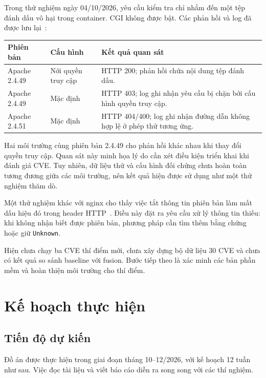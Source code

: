 \documentclass[11pt,a4paper]{article}
\begin{document}
Trong thử nghiệm ngày 04/10/2026, yêu cầu kiểm tra chỉ nhắm đến một tệp đánh dấu vô hại trong container. CGI không được bật. Các phản hồi và log đã được lưu lại~\cite{labrecord}:

\begin{center}
\small
\begin{tabularx}{\linewidth}{@{}P{2.5cm}P{3.5cm}Y@{}}
\toprule
\textbf{Phiên bản} & \textbf{Cấu hình} & \textbf{Kết quả quan sát} \\
\midrule
Apache 2.4.49 & Nới quyền truy cập & HTTP 200; phản hồi chứa nội dung tệp đánh dấu. \\
Apache 2.4.49 & Mặc định & HTTP 403; log ghi nhận yêu cầu bị chặn bởi cấu hình quyền truy cập. \\
Apache 2.4.51 & Mặc định & HTTP 404/400; log ghi nhận đường dẫn không hợp lệ ở phép thử tương ứng. \\
\bottomrule
\end{tabularx}
\end{center}

Hai môi trường cùng phiên bản 2.4.49 cho phản hồi khác nhau khi thay đổi quyền truy cập. Quan sát này minh họa lý do cần xét điều kiện triển khai khi đánh giá CVE. Tuy nhiên, dữ liệu thử và cấu hình đối chứng chưa hoàn toàn tương đương giữa các môi trường, nên kết quả hiện được sử dụng như một thử nghiệm thăm dò.

Một thử nghiệm khác với nginx cho thấy việc tắt thông tin phiên bản làm mất dấu hiệu đó trong header HTTP~\cite{labrecord}. Điều này đặt ra yêu cầu xử lý thông tin thiếu: khi không nhận biết được phiên bản, phương pháp cần tìm thêm bằng chứng hoặc giữ \texttt{Unknown}.

Hiện chưa chạy ba CVE thí điểm mới, chưa xây dựng bộ dữ liệu 30 CVE và chưa có kết quả so sánh baseline với fusion. Bước tiếp theo là xác minh các bản phần mềm và hoàn thiện môi trường cho thí điểm.

\section{Kế hoạch thực hiện}

\subsection{Tiến độ dự kiến}

Đồ án được thực hiện trong giai đoạn tháng 10--12/2026, với kế hoạch 12 tuần như sau. Việc đọc tài liệu và viết báo cáo diễn ra song song với các thí nghiệm.
\end{document}
